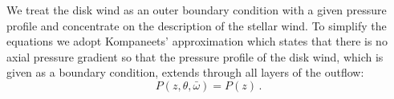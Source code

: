 We treat the disk wind as an outer boundary condition with a given pressure profile and concentrate on the description of the stellar wind. To simplify the equations we adopt Kompaneets' approximation \citep{1960SPhD....5...46K} which states that there is no axial pressure gradient so that the pressure profile of the disk wind, which is given as a boundary condition, extends through all layers of the outflow:
\begin{equation}
P(z,\theta, \bar{\omega}) = P(z)\,.
\end{equation}

